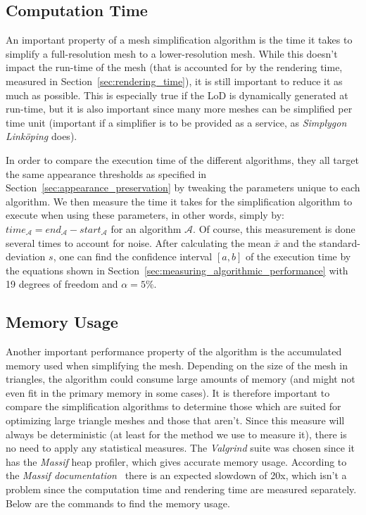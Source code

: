 \subsection{Computation Time} \label{sec:computation_time}

An important property of a mesh simplification algorithm is the time it takes to simplify a full-resolution mesh to a lower-resolution mesh. While this doesn't impact the run-time of the mesh (that is accounted for by the rendering time, measured in Section~\ref{sec:rendering_time}), it is still important to reduce it as much as possible. This is especially true if the LoD is dynamically generated at run-time, but it is also important since many more meshes can be simplified per time unit (important if a simplifier is to be provided as a service, as \emph{Simplygon Linköping} does).

In order to compare the execution time of the different algorithms, they all target the same appearance thresholds as specified in Section~\ref{sec:appearance_preservation} by tweaking the parameters unique to each algorithm. We then measure the time it takes for the simplification algorithm to execute when using these parameters, in other words, simply by: \(time_\mathcal{A} = end_\mathcal{A} - start_\mathcal{A}\) for an algorithm \(\mathcal{A}\). Of course, this measurement is done several times to account for noise. After calculating the mean \(\bar{x}\) and the standard-deviation \(s\), one can find the confidence interval \([a, b]\) of the execution time by the equations shown in Section~\ref{sec:measuring_algorithmic_performance} with 19 degrees of freedom and \(\alpha = 5 \%\).

\subsection{Memory Usage} \label{sec:memory_usage}

Another important performance property of the algorithm is the accumulated memory used when simplifying the mesh. Depending on the size of the mesh in triangles, the algorithm could consume large amounts of memory (and might not even fit in the primary memory in some cases). It is therefore important to compare the simplification algorithms to determine those which are suited for optimizing large triangle meshes and those that aren't. Since this measure will always be deterministic (at least for the method we use to measure it), there is no need to apply any statistical measures. The \emph{Valgrind} suite was chosen since it has the \emph{Massif} heap profiler, which gives accurate memory usage. According to the \emph{Massif documentation}~\cite{valgrind2017manual} there is an expected slowdown of 20x, which isn't a problem since the computation time and rendering time are measured separately. Below are the commands to find the memory usage.

